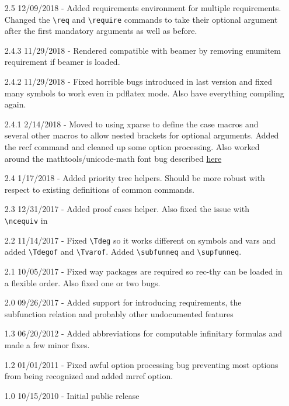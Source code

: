 \documentclass[leqno,11pt]{amsart}
\begin{document}
\begin{itemize}
	\item[2.5] 12/09/2018 - Added requirements environment for multiple requirements.  Changed the \verb=\req= and \verb=\require= commands to take their optional argument after the first mandatory arguments as well as before.
	\item[2.4.3] 11/29/2018 - Rendered compatible with beamer by removing enumitem requirement if beamer is loaded.
	\item[2.4.2] 11/29/2018 - Fixed horrible bugs introduced in last version and fixed many symbols to work even in pdflatex mode.  Also have everything compiling again.
	\item[2.4.1] 2/14/2018 - Moved to using xparse to define the case macros and several other macros to allow nested brackets for optional arguments.  Added the recf command and cleaned up some option processing.  Also worked around the mathtools/unicode-math font bug described \href{https://tex.stackexchange.com/questions/335164/incompatibility-with-mathtools-and-unicode-math-in-xelatex/335177}{here}
	\item[2.4] 1/17/2018 - Added priority tree helpers.  Should be more robust with respect to existing definitions of common commands.
	\item[2.3] 12/31/2017 - Added proof cases helper.  Also fixed the issue with \verb=\ncequiv= in \XeLaTeX
	\item[2.2] 11/14/2017 - Fixed \verb=\Tdeg= so it works different on symbols and vars and added \verb=\Tdegof= and \verb=\Tvarof=.  Added \verb=\subfunneq= and \verb=\supfunneq=.
	\item[2.1] 10/05/2017 - Fixed way packages are required so rec-thy can be loaded in a flexible order.  Also fixed one or two bugs.
	\item[2.0] 09/26/2017 - Added support for introducing requirements, the subfunction relation and probably other undocumented features
	\item[1.3] 06/20/2012 - Added abbreviations for computable infinitary formulas and made a few minor fixes.
	\item[1.2] 01/01/2011 - Fixed awful option processing bug preventing most options from being recognized and added mrref option.
	\item[1.0] 10/15/2010 - Initial public release
\end{itemize}
\end{document}
